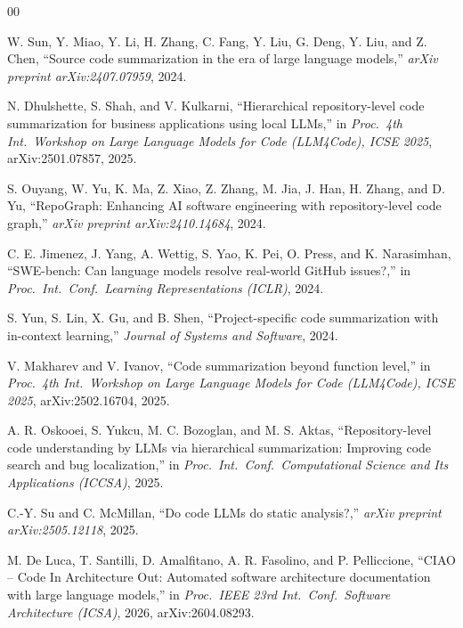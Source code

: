 \documentclass[conference]{IEEEtran}
\begin{document}

\begin{thebibliography}{00}

W. Sun, Y. Miao, Y. Li, H. Zhang, C. Fang, Y. Liu, G. Deng, Y. Liu, and Z. Chen,
``Source code summarization in the era of large language models,''
\emph{arXiv preprint arXiv:2407.07959}, 2024.

N. Dhulshette, S. Shah, and V. Kulkarni,
``Hierarchical repository-level code summarization for business applications using local LLMs,''
in \emph{Proc.\ 4th Int.\ Workshop on Large Language Models for Code (LLM4Code), ICSE 2025},
arXiv:2501.07857, 2025.

S. Ouyang, W. Yu, K. Ma, Z. Xiao, Z. Zhang, M. Jia, J. Han, H. Zhang, and D. Yu,
``RepoGraph: Enhancing AI software engineering with repository-level code graph,''
\emph{arXiv preprint arXiv:2410.14684}, 2024.

C. E. Jimenez, J. Yang, A. Wettig, S. Yao, K. Pei, O. Press, and K. Narasimhan,
``SWE-bench: Can language models resolve real-world GitHub issues?,''
in \emph{Proc.\ Int.\ Conf.\ Learning Representations (ICLR)}, 2024.

S. Yun, S. Lin, X. Gu, and B. Shen,
``Project-specific code summarization with in-context learning,''
\emph{Journal of Systems and Software}, 2024.

V. Makharev and V. Ivanov,
``Code summarization beyond function level,''
in \emph{Proc.\ 4th Int.\ Workshop on Large Language Models for Code (LLM4Code), ICSE 2025},
arXiv:2502.16704, 2025.

A. R. Oskooei, S. Yukcu, M. C. Bozoglan, and M. S. Aktas,
``Repository-level code understanding by LLMs via hierarchical summarization: Improving code
search and bug localization,''
in \emph{Proc.\ Int.\ Conf.\ Computational Science and Its Applications (ICCSA)}, 2025.

C.-Y. Su and C. McMillan,
``Do code LLMs do static analysis?,''
\emph{arXiv preprint arXiv:2505.12118}, 2025.

M. De Luca, T. Santilli, D. Amalfitano, A. R. Fasolino, and P. Pelliccione,
``CIAO -- Code In Architecture Out: Automated software architecture documentation with large
language models,''
in \emph{Proc.\ IEEE 23rd Int.\ Conf.\ Software Architecture (ICSA)}, 2026, arXiv:2604.08293.


\end{thebibliography}
\end{document}
